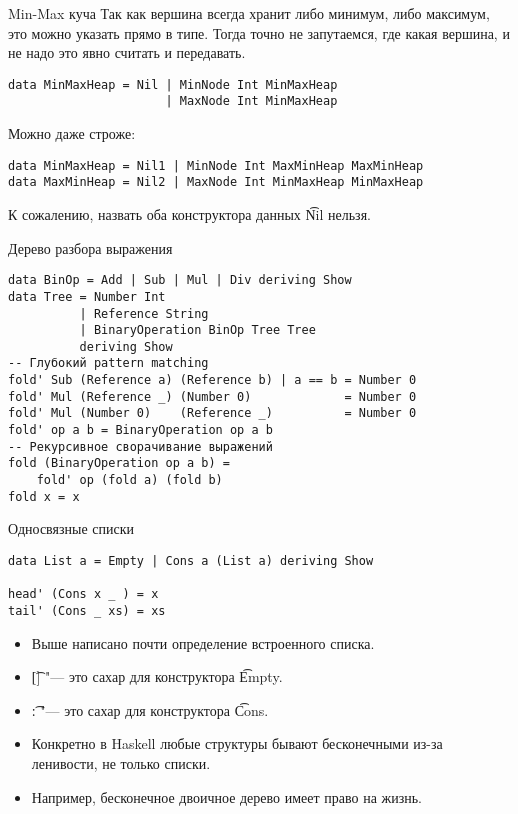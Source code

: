 \begin{frame}[fragile]{Min-Max куча}
	Так как вершина всегда хранит либо минимум, либо максимум, это можно указать прямо в типе.
	Тогда точно не запутаемся, где какая вершина, и не надо это явно считать и передавать.
\begin{verbatim}
data MinMaxHeap = Nil | MinNode Int MinMaxHeap 
                      | MaxNode Int MinMaxHeap 
\end{verbatim}
	Можно даже строже:
\begin{verbatim}
data MinMaxHeap = Nil1 | MinNode Int MaxMinHeap MaxMinHeap
data MaxMinHeap = Nil2 | MaxNode Int MinMaxHeap MinMaxHeap
\end{verbatim}	
	К сожалению, назвать оба конструктора данных \t{Nil} нельзя.
\end{frame}

\begin{frame}[fragile]{Дерево разбора выражения}
\begin{verbatim}
data BinOp = Add | Sub | Mul | Div deriving Show
data Tree = Number Int
          | Reference String
          | BinaryOperation BinOp Tree Tree
          deriving Show
-- Глубокий pattern matching
fold' Sub (Reference a) (Reference b) | a == b = Number 0
fold' Mul (Reference _) (Number 0)             = Number 0
fold' Mul (Number 0)    (Reference _)          = Number 0
fold' op a b = BinaryOperation op a b
-- Рекурсивное сворачивание выражений
fold (BinaryOperation op a b) =
    fold' op (fold a) (fold b)
fold x = x
\end{verbatim}
\end{frame}

\begin{frame}[fragile]{Односвязные списки}
\begin{verbatim}
data List a = Empty | Cons a (List a) deriving Show

head' (Cons x _ ) = x
tail' (Cons _ xs) = xs
\end{verbatim}
	\begin{itemize}
		\item Выше написано почти определение встроенного списка.
		\item \t{[]} "--- это сахар для конструктора \t{Empty}.
		\item \t{:} "--- это сахар для конструктора \t{Cons}.
		\item Конкретно в Haskell любые структуры бывают бесконечными из-за ленивости, не только списки.
		\item Например, бесконечное двоичное дерево имеет право на жизнь.
	\end{itemize}
\end{frame}

